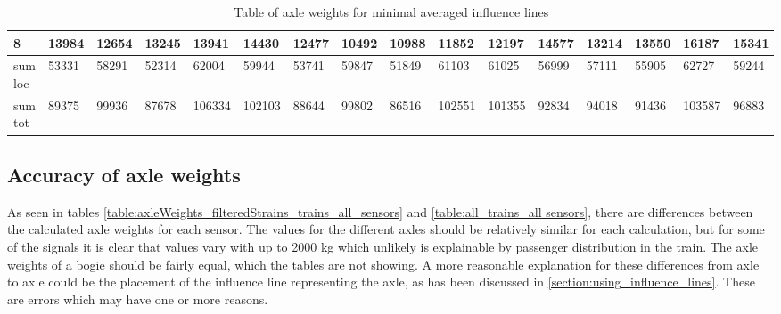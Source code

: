 \begin{sidewaystable}[htpb]
{\begin{tabularx}{\textheight}{ |l|X|X|X|X|X|X|X|X|X|X|X|X|X|X|X| }
			\hline
			8 & 13984   &    12654   &    13245   &    13941   &    14430   &    12477    &   10492    &   10988    &   11852   &    12197   &    14577   &    13214   &    13550   &    16187 & 15341 \\
			\hline
			sum loc & 53331   &    58291   &    52314   &    62004   &    59944   &    53741    &   59847    &   51849    &   61103   &    61025   &    56999   &    57111   &    55905   &   62727 & 59244 \\
			\hline
			sum tot & 89375   &    99936   &    87678   &   106334   &   102103   &    88644    &   99802    &   86516    &  102551   &   101355   &    92834   &    94018   &    91436   &   103587 & 96883 \\
			\hline
		\end{tabularx}}
	\caption{Table of axle weights for minimal averaged influence lines}
	\label{table:axleWeights_for_minimalInfl}
\end{sidewaystable}
\subsection{Accuracy of axle weights}

As seen in tables \ref{table:axleWeights_filteredStrains_trains_all_sensors} and \ref{table:all_trains_all sensors}, there are differences between the calculated axle weights for each sensor. The values for the different axles should be relatively similar for each calculation, but for some of the signals it is clear that values vary with up to 2000 kg which unlikely is explainable by passenger distribution in the train. The axle weights of a bogie should be fairly equal, which the tables are not showing. A more reasonable explanation for these differences from axle to axle could be the placement of the influence line representing the axle, as has been discussed in \ref{section:using_influence_lines}. These are errors which may have one or more reasons.

